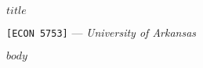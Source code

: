 \documentclass[12pt]{article}
\begin{document}
\begin{center}
  {\Huge\bf $title$}

  \smallskip
  {\large\texttt{[ECON 5753]} — \textit{University of Arkansas}}

\end{center}

$body$
\end{document}
